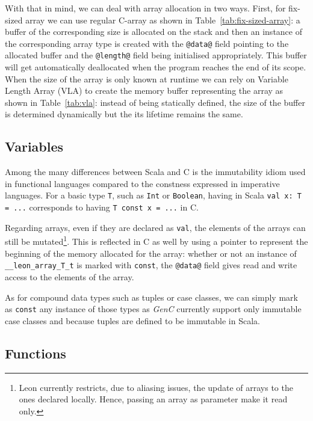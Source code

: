 \documentclass{article}
\newcommand{\inlineC}[1]{\lstinline[language=C99]|#1|}
\newcommand{\inlineScala}[1]{\lstinline[language=MyScala]|#1|}
\newcommand{\GenC}{\emph{GenC}\xspace}
\begin{document}
With that in mind, we can deal with array allocation in two ways. First, for
fix-sized array we can use regular C-array as shown in
Table~\ref{tab:fix-sized-array}: a buffer of the corresponding size is allocated
on the stack and then an instance of the corresponding array type is created
with the \inlineC{@data@} field pointing to the allocated buffer and the
\inlineC{@length@} field being initialised appropriately. This buffer will get
automatically deallocated when the program reaches the end of its scope. When
the size of the array is only known at runtime we can rely on Variable Length
Array (VLA) to create the memory buffer representing the array as shown in
Table~\ref{tab:vla}: instead of being statically defined, the size of the buffer
is determined dynamically but the its lifetime remains the same.



\subsection{Variables}

Among the many differences between Scala and C is the immutability idiom used in
functional languages compared to the constness expressed in imperative
languages. For a basic type \inlineScala{T}, such as \inlineScala{Int} or
\inlineScala{Boolean}, having in Scala \inlineScala{val x: T = ...} corresponds
to having \inlineC{T const x = ...} in C.

Regarding arrays, even if they are declared as \inlineScala{val}, the elements
of the arrays can still be mutated\footnote{Leon currently restricts, due to
aliasing issues, the update of arrays to the ones declared locally. Hence,
passing an array as parameter make it read only.}. This is reflected in C as
well by using a pointer to represent the beginning of the memory allocated for
the array: whether or not an instance of \inlineC{__leon_array_T_t} is marked
with \inlineC{const}, the \inlineC{@data@} field gives read and write access to
the elements of the array.

As for compound data types such as tuples or case classes, we can simply mark as
\inlineC{const} any instance of those types as \GenC currently support only
immutable case classes and because tuples are defined to be immutable in Scala.



\subsection{Functions}
\end{document}
